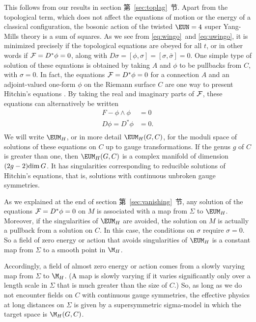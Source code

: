 This  follows from our results in section 第~\ref{sec:toplag}~节.  Apart from the
topological term, which does not affect the equations of motion or
the energy of a classical configuration, the bosonic action of the
twisted ${\EUN}=4$ super Yang-Mills theory is a sum of squares. As
we see from \eqref{eq:wingo}\ and \eqref{eq:uwingo}, it is minimized precisely if the
topological equations are obeyed for all $t$, or in other words if
${\cal F}=D^*\phi=0$, along with
$D\sigma=[\phi,\sigma]=[\sigma,\bar\sigma]=0$. One simple type of
solution of these equations is obtained by taking $A$ and $\phi$
to be pullbacks from $C$, with $\sigma=0$. In fact, the equations
${\cal F}=D^*\phi=0$ for a connection $A$ and an adjoint-valued
one-form $\phi$ on the Riemann surface $C$ are one way to present
Hitchin's equations \cite{ref20}.  By taking the real and imaginary
parts of ${\cal F}$, these equations can alternatively be written
\setcounter{equation}{0}
\begin{equation}\label{eq:zongo}
\begin{aligned} F-\phi\wedge\phi & = 0\\ D\phi=D^*\phi&=0
.\\\end{aligned}
\end{equation}
  We will write $\MH$, or in more detail $\MH(G,C)$, for the
moduli space of solutions of these equations on $C$ up to gauge
transformations.  If the genus $g$ of $C$ is greater than one,
then $\MH(G,C)$ is a complex manifold of dimension $(2g-2){\rm
dim}\,G$.  It has singularities corresponding to reducible
solutions of Hitchin's equations, that is, solutions with
continuous unbroken gauge symmetries.

As we explained at the end of section 第~\ref{sec:vanishing}~节, any solution of
the equations ${\cal F}=D^*\phi=0$ on $M$ is associated with a map
from $\Sigma$ to $\MH$.  Moreover, if the singularities of $\MH$
are avoided, the solution on $M$ is actually a pullback from a
solution on $C$.  In this case, the conditions on $\sigma$ require
$\sigma=0$.
 So a  field of zero
energy or action that avoids singularities of $\MH$ is a constant
map from $\Sigma$ to a smooth point in  $\M_H$.

Accordingly, a field of almost zero energy or action comes from a
slowly varying map from $\Sigma$ to $\M_H$. (A map is slowly
varying if it varies significantly only over a length scale in
$\Sigma$ that is much greater than the size of $C$.)   So, as long
as we do not encounter fields on $C$ with continuous gauge
symmetries, the effective physics at long distances on $\Sigma$ is
given by a supersymmetric sigma-model in which the target space is
$\M_H(G,C)$.

